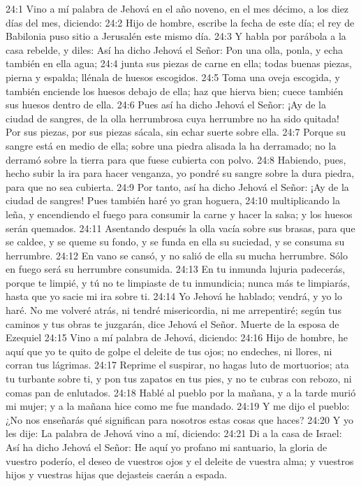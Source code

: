 24:1 Vino a mí palabra de Jehová en el año noveno, en el mes décimo, a los diez días del mes, diciendo:   
24:2 Hijo de hombre, escribe la fecha de este día; el rey de Babilonia puso sitio a Jerusalén este mismo día.   
24:3 Y habla por parábola a la casa rebelde, y diles: Así ha dicho Jehová el Señor: Pon una olla, ponla, y echa también en ella agua;   
24:4 junta sus piezas de carne en ella; todas buenas piezas, pierna y espalda; llénala de huesos escogidos.   
24:5 Toma una oveja escogida, y también enciende los huesos debajo de ella; haz que hierva bien; cuece también sus huesos dentro de ella.   
24:6 Pues así ha dicho Jehová el Señor: ¡Ay de la ciudad de sangres, de la olla herrumbrosa cuya herrumbre no ha sido quitada! Por sus piezas, por sus piezas sácala, sin echar suerte sobre ella.   
24:7 Porque su sangre está en medio de ella; sobre una piedra alisada la ha derramado; no la derramó sobre la tierra para que fuese cubierta con polvo.   
24:8 Habiendo, pues, hecho subir la ira para hacer venganza, yo pondré su sangre sobre la dura piedra, para que no sea cubierta.   
24:9 Por tanto, así ha dicho Jehová el Señor: ¡Ay de la ciudad de sangres! Pues también haré yo gran hoguera,   
24:10 multiplicando la leña, y encendiendo el fuego para consumir la carne y hacer la salsa; y los huesos serán quemados.   
24:11 Asentando después la olla vacía sobre sus brasas, para que se caldee, y se queme su fondo, y se funda en ella su suciedad, y se consuma su herrumbre.   
24:12 En vano se cansó, y no salió de ella su mucha herrumbre. Sólo en fuego será su herrumbre consumida.   
24:13 En tu inmunda lujuria padecerás, porque te limpié, y tú no te limpiaste de tu inmundicia; nunca más te limpiarás, hasta que yo sacie mi ira sobre ti.   
24:14 Yo Jehová he hablado; vendrá, y yo lo haré. No me volveré atrás, ni tendré misericordia, ni me arrepentiré; según tus caminos y tus obras te juzgarán, dice Jehová el Señor.   
Muerte de la esposa de Ezequiel   
24:15 Vino a mí palabra de Jehová, diciendo:   
24:16 Hijo de hombre, he aquí que yo te quito de golpe el deleite de tus ojos; no endeches, ni llores, ni corran tus lágrimas.   
24:17 Reprime el suspirar, no hagas luto de mortuorios; ata tu turbante sobre ti, y pon tus zapatos en tus pies, y no te cubras con rebozo, ni comas pan de enlutados.   
24:18 Hablé al pueblo por la mañana, y a la tarde murió mi mujer; y a la mañana hice como me fue mandado.   
24:19 Y me dijo el pueblo: ¿No nos enseñarás qué significan para nosotros estas cosas que haces?   
24:20 Y yo les dije: La palabra de Jehová vino a mí, diciendo:   
24:21 Di a la casa de Israel: Así ha dicho Jehová el Señor: He aquí yo profano mi santuario, la gloria de vuestro poderío, el deseo de vuestros ojos y el deleite de vuestra alma; y vuestros hijos y vuestras hijas que dejasteis caerán a espada.   
